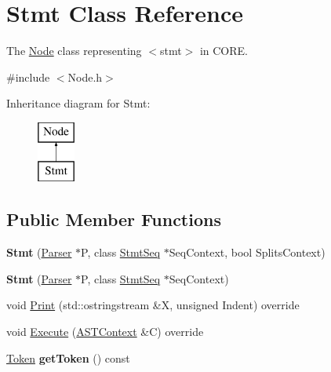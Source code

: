 \hypertarget{class_stmt}{}\section{Stmt Class Reference}
\label{class_stmt}


The \mbox{\hyperlink{class_node}{Node}} class representing {\ttfamily $<$stmt$>$} in C\+O\+RE.  




{\ttfamily \#include $<$Node.\+h$>$}

Inheritance diagram for Stmt\+:\begin{figure}[H]
\begin{center}
\leavevmode
\includegraphics[height=2.000000cm]{class_stmt}
\end{center}
\end{figure}
\subsection*{Public Member Functions}
\begin{DoxyCompactItemize}
\item 
\mbox{\label{class_stmt_ada55db9525025c03d246f59b0a8d97d8}} 
{\bfseries Stmt} (\mbox{\hyperlink{class_parser}{Parser}} $\ast$P, class \mbox{\hyperlink{class_stmt_seq}{Stmt\+Seq}} $\ast$Seq\+Context, bool Splits\+Context)
\item 
\mbox{\label{class_stmt_a50d41532bd44ef709d8a86621003bb39}} 
{\bfseries Stmt} (\mbox{\hyperlink{class_parser}{Parser}} $\ast$P, class \mbox{\hyperlink{class_stmt_seq}{Stmt\+Seq}} $\ast$Seq\+Context)
\item 
void \mbox{\hyperlink{class_stmt_a7d29a5e877b3fa073d3c2e9da3effb27}{Print}} (std\+::ostringstream \&X, unsigned Indent) override
\item 
void \mbox{\hyperlink{class_stmt_a25f70d265d704c43b99d20442470bb71}{Execute}} (\mbox{\hyperlink{class_a_s_t_context}{A\+S\+T\+Context}} \&C) override
\item 
\mbox{\label{class_stmt_af90766d63b065421eab0b6e5e9854cd7}} 
\mbox{\hyperlink{class_token}{Token}} {\bfseries get\+Token} () const
\end{DoxyCompactItemize}
